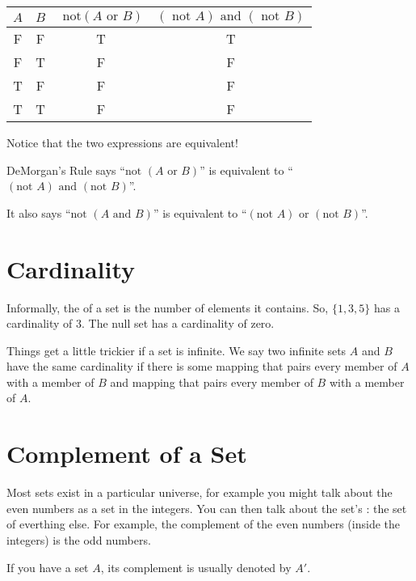 \begin{Answer}[ref=logic_table]

\begin{tabular}{c | c | c | c}
  $A$ & $B$ & $\text{ not} \left(A \text{ or } B \right)$
  & $\left(\text{ not } A \right) \text{ and } \left(\text{ not } B \right)$ \\
  \hline
  F & F & T & T \\
  F & T & F & F \\
  T & F & F & F \\
  T & T & F & F \\
\end{tabular}

Notice that the two expressions are equivalent!

DeMorgan's Rule says ``$\text{not } \left(A \text{ or } B \right)$'' is
equivalent to ``$\left(\text{not } A \right) \text{ and } \left(\text{not } B
\right)$''.

It also says ``$\text{not } \left(A \text{ and } B \right)$'' is
equivalent to ``$\left(\text{not } A \right) \text{ or } \left(\text{not } B\right)$''.

\end{Answer}

\section{Cardinality}

Informally, the  of a set is the number of
elements it contains. So, $\{1,3,5\}$ has a cardinality of 3.  The
null set has a cardinality of zero.

Things get a little trickier if a set is infinite.  We say two
infinite sets $A$ and $B$ have the same cardinality if there is some
mapping that pairs every member of $A$ with a member of $B$ and
mapping that pairs every member of $B$ with a member of $A$.

\section{Complement of a Set}

Most sets exist in a particular universe, for example you might talk
about the even numbers as a set in the integers. You can then talk
about the set's : the set of everthing else. For
example, the complement of the even numbers (inside the integers) is
the odd numbers.

If you have a set $A$, its complement is usually denoted by $A'$.

